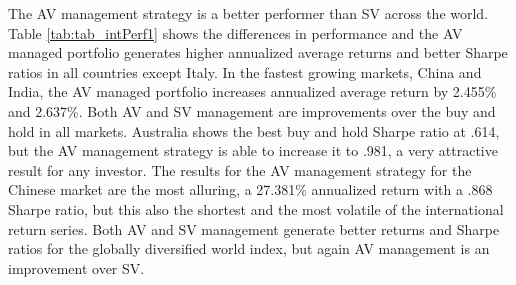 %

The AV management strategy is a better performer than SV across the world. Table \ref{tab:tab_intPerf1} shows the differences in performance and the AV managed portfolio generates higher annualized average returns and better Sharpe ratios in all countries except Italy. In the fastest growing markets, China and India, the AV managed portfolio increases annualized average return by 2.455\% and 2.637\%. Both AV and SV management are improvements over the buy and hold in all markets. Australia shows the best buy and hold Sharpe ratio at .614, but the AV management strategy is able to increase it to .981, a very attractive result for any investor. The results for the AV management strategy for the Chinese market are the most alluring, a 27.381\% annualized return with a .868 Sharpe ratio, but this also the shortest and the most volatile of the international return series. Both AV and SV management generate better returns and Sharpe ratios for the globally diversified world index, but again AV management is an improvement over SV.

